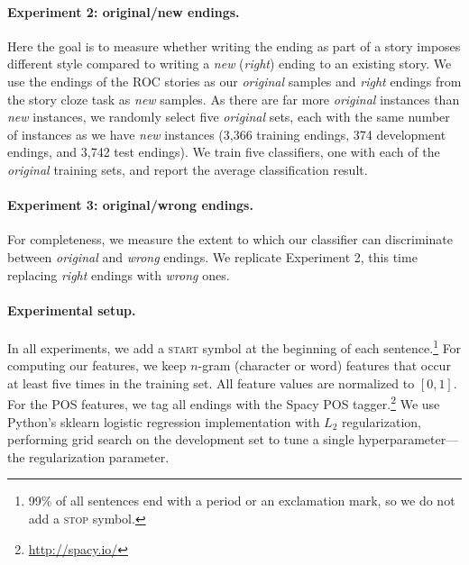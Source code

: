 \documentclass[11pt,a4paper]{article}
\newcommand{\resolved}[1]{}
\newcommand{\roy}[1]{{\color{orange}\textsc{[#1 --rs]}}}
\newcommand{\nascomment}[1]{{\color{blue}\textsc{[#1 --nas]}}}
\renewcommand{\roy}[1]{{\color{orange}[#1 --rs]}}
\renewcommand{\roy}[1]{#1}
\renewcommand{\nascomment}[1]{}
\begin{document}
\paragraph{Experiment 2: original/new endings.}

Here the goal is to measure whether writing the ending as part of a
story imposes different style compared to writing a {\it new} ({\it right}) ending to an existing story.
We use the endings of the ROC stories as our {\it original} samples and {\it right} endings from the story cloze task   \resolved{\nascomment{if you're using the test examples as
  training data, what are you using for test? and development?  I would have thought
  you'd follow the same pattern as above ... }}as {\it new} samples.
As there are far more {\it original} instances than {\it new}
instances, we randomly select five  {\it original} sets, each with the same number of
instances  \resolved{\nascomment{(give the number in parentheses, for train/dev/test)} }as we have
\emph{new} instances (3,366 training endings, 374 development endings, and 3,742 test endings).
We train five classifiers, one with each of the {\it original} training sets, and report the average classification result.

\roy{\paragraph{Experiment 3: original/wrong endings.}
For completeness, we measure the extent to which our classifier can discriminate between {\it original} and {\it wrong} endings. We replicate Experiment 2, this time replacing {\it right} endings with {\it wrong} ones.}


\paragraph{Experimental setup.}
In all experiments, we add a \textsc{start} symbol at the beginning
of each sentence.\footnote{99\% of all sentences end with a period
  or an exclamation mark, so we do not add a \textsc{stop} symbol.}
For computing our features, we keep $n$-gram (character or word) features that occur at least five times in the training set.
All feature values are normalized to $[0, 1]$.
For the POS features, we tag all endings with the Spacy POS tagger.\footnote{\url{http://spacy.io/}}
We use  Python's sklearn logistic regression implementation \cite{scikit-learn} with $L_2$
regularization, performing grid search on the development set to
tune a single hyperparameter---the regularization parameter.   \resolved{\nascomment{any other hyperparameters?  if
  not, say this is the only one.  else explain what they are.}}
\end{document}
